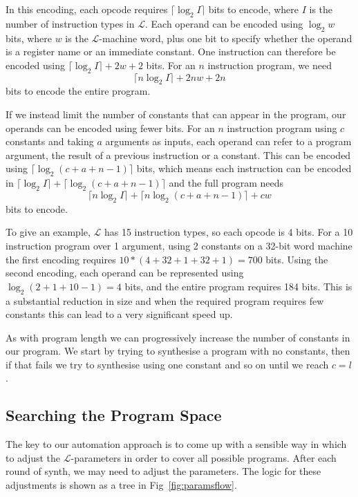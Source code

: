 \documentclass[a4paper]{llncs}
\begin{document}
In this encoding, each opcode requires $\lceil \log_2 I \rceil$ bits to encode, where $I$ is the number
of instruction types in $\mathcal{L}$.  Each operand can be encoded using
$\log_2 w$ bits, where $w$ is the $\mathcal{L}$-machine word, plus one
bit to specify whether the operand is a register name or an immediate constant.
One instruction can therefore be encoded using $\lceil \log_2 I \rceil + 2w + 2$ bits.
For an $n$ instruction program, we need $$\lceil n \log_2 I \rceil + 2nw + 2n$$ bits to encode
the entire program.

If we instead limit the number of constants that can appear in the program,
our operands can be encoded using fewer bits.  For an $n$ instruction program
using $c$ constants and taking $a$ arguments as inputs, each operand can refer
to a program argument, the result of a previous instruction or a constant.
This can be encoded using $\lceil \log_2 (c+a+n-1) \rceil$ bits, which means each instruction
can be encoded in $\lceil \log_2 I \rceil + \lceil \log_2 (c + a + n - 1) \rceil$ and the full program
needs $$\lceil n \log_2 I \rceil + \lceil n \log_2 (c + a + n - 1) \rceil + cw$$ bits to encode.

To give an example, $\mathcal{L}$ has 15 instruction types, so each opcode is 4 bits.
For a 10 instruction program over 1 argument, using 2 constants on a 32-bit word
machine the first encoding requires $10 * (4 + 32 + 1 + 32 + 1) = 700$ bits.
Using the second encoding, each operand can be represented using
$\log_2 (2 + 1 + 10 - 1) = 4$ bits, and the entire program requires 184 bits.
This is a substantial reduction in size and when the required program requires
few constants this can lead to a very significant speed up.

As with program length we can progressively increase the number of constants in
our program.  We start by trying to synthesise a program with no constants, then
if that fails we try to synthesise using one constant and so on until we reach
$c = l$.

\subsection{Searching the Program Space}
The key to our automation approach is to come up with a sensible way in which to
adjust the $\mathcal{L}$-parameters in order to cover all possible programs.
After each round of {\sc synth}, we may need to adjust the parameters.  The
logic for these adjustments is shown as a tree in Fig~\ref{fig:paramsflow}.
\end{document}
